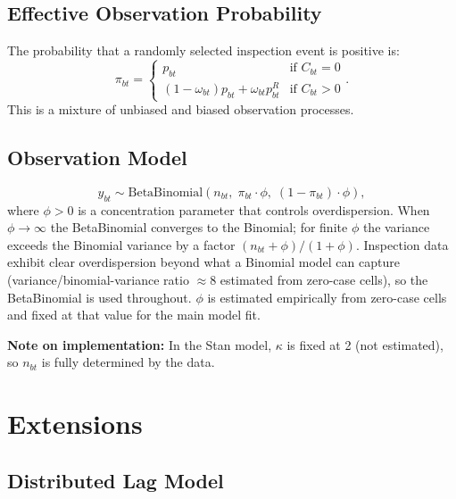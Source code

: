 \documentclass[12pt,a4paper]{article}
\begin{document}
\subsection{Effective Observation Probability}

The probability that a randomly selected inspection event is positive is:
\begin{equation}
\pi_{bt} = \begin{cases}
p_{bt} & \text{if } C_{bt} = 0 \\
(1 - \omega_{bt})p_{bt} + \omega_{bt}p_{bt}^R & \text{if } C_{bt} > 0
\end{cases}.
\end{equation}
This is a mixture of unbiased and biased observation processes.

\subsection{Observation Model}

\begin{equation}
y_{bt} \sim \text{BetaBinomial}(n_{bt},\; \pi_{bt} \cdot \phi,\; (1-\pi_{bt}) \cdot \phi),
\end{equation}
where $\phi > 0$ is a concentration parameter that controls overdispersion. When $\phi \to \infty$ the BetaBinomial converges to the Binomial; for finite $\phi$ the variance exceeds the Binomial variance by a factor $(n_{bt} + \phi)/(1 + \phi)$. Inspection data exhibit clear overdispersion beyond what a Binomial model can capture (variance/binomial-variance ratio $\approx 8$ estimated from zero-case cells), so the BetaBinomial is used throughout. $\phi$ is estimated empirically from zero-case cells and fixed at that value for the main model fit.

\textbf{Note on implementation:} In the Stan model, $\kappa$ is fixed at 2 (not estimated), so $n_{bt}$ is fully determined by the data.

\section{Extensions}

\subsection{Distributed Lag Model}
\end{document}
